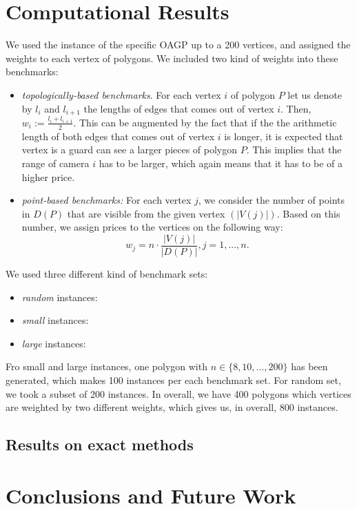 \documentclass[runningheads,a4paper]{elsarticle}
\begin{document}
	\section{Computational Results}
	We used the instance of the specific OAGP up to a 200 vertices, and assigned the weights to each vertex of polygons. We included two kind of weights into these benchmarks:
	\begin{itemize}
		\item \emph{topologically-based benchmarks}. For each vertex $i$ of polygon $P$ let us denote by $l_i$ and $l_{i+1}$ the lengths of edges that comes out of vertex $i$. Then, $w_i := \frac{l_i + l_{i+1}}{2}$. This can be augmented by the fact that if the the arithmetic length of both edges that comes out of vertex $i$ is longer, it is expected that vertex is a guard can see a larger pieces of polygon $P$. This implies that the range of camera $i$ has to be larger, which again means that it has to be of a higher price.
		\item \emph{point-based benchmarks:} For each vertex $j$, we consider the number of points in $D(P)$ that are visible from the given vertex $(|V(j)|)$. Based on this number, we assign prices to the vertices on the following way:
		\begin{equation}
		w_j = n \cdot \frac{|V(j)|}{|D(P)|}, j=1,...,n.
		\end{equation}
	\end{itemize}
     We used three different kind of benchmark sets:
     \begin{itemize}
     	\item \emph{random} instances: 
     	\item \emph{small} instances:
     	\item \emph{large} instances: 
     \end{itemize}
     Fro small and large instances, one polygon with $n \in\{8,10,...,200\}$ has been generated, which makes 100 instances per each benchmark set. For random set, we took a subset of 200 instances. In overall, we have 400 polygons which vertices are weighted by two different weights, which gives us, in overall, 800 instances.
	\subsection{Results on exact methods}
	\section{Conclusions and Future Work}
	
	
	
	
	
	
	
\end{document}
